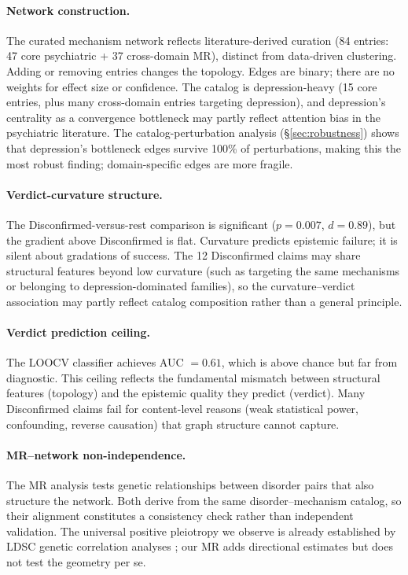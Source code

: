 \documentclass[11pt]{article}
\begin{document}
\paragraph{Network construction.} The curated mechanism network reflects literature-derived curation (84 entries: 47 core psychiatric + 37 cross-domain MR), distinct from data-driven clustering. Adding or removing entries changes the topology. Edges are binary; there are no weights for effect size or confidence. The catalog is depression-heavy (15 core entries, plus many cross-domain entries targeting depression), and depression's centrality as a convergence bottleneck may partly reflect attention bias in the psychiatric literature. The catalog-perturbation analysis (\S\ref{sec:robustness}) shows that depression's bottleneck edges survive 100\% of perturbations, making this the most robust finding; domain-specific edges are more fragile.

\paragraph{Verdict-curvature structure.} The Disconfirmed-versus-rest comparison is significant ($p = 0.007$, $d = 0.89$), but the gradient above Disconfirmed is flat. Curvature predicts epistemic failure; it is silent about gradations of success. The 12 Disconfirmed claims may share structural features beyond low curvature (such as targeting the same mechanisms or belonging to depression-dominated families), so the curvature--verdict association may partly reflect catalog composition rather than a general principle.

\paragraph{Verdict prediction ceiling.} The LOOCV classifier achieves AUC $= 0.61$, which is above chance but far from diagnostic. This ceiling reflects the fundamental mismatch between structural features (topology) and the epistemic quality they predict (verdict). Many Disconfirmed claims fail for content-level reasons (weak statistical power, confounding, reverse causation) that graph structure cannot capture.

\paragraph{MR--network non-independence.} The MR analysis tests genetic relationships between disorder pairs that also structure the network. Both derive from the same disorder--mechanism catalog, so their alignment constitutes a consistency check rather than independent validation. The universal positive pleiotropy we observe is already established by LDSC genetic correlation analyses \citep{buliksullivan2015atlas, anttila2018analysis}; our MR adds directional estimates but does not test the geometry per se.
\end{document}
